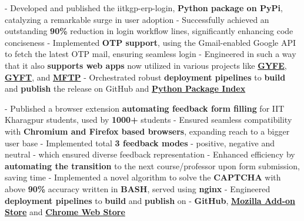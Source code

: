 \documentclass[a4paper,10pt]{extarticle} %
\begin{document}
\begin{description}[style=nextline, font=$\bullet$\hspace{2mm}\normalsize]
\item[{\href{https://github.com/proffapt/iitkgp-erp-login-pypi}{ERP Login Module}} | Python, Gmail API]
- Developed and published the iitkgp-erp-login, \textbf{Python package on PyPi}, catalyzing a remarkable surge in user adoption \newline
- Successfully achieved an outstanding \textbf{90\%} reduction in login workflow lines, significantly enhancing code conciseness \newline
- Implemented \textbf{OTP support}, using the Gmail-enabled Google API to fetch the latest OTP mail, ensuring seamless login \newline
- Engineered in such a way that it also \textbf{supports web apps} now utilized in various projects like \href{https://gyfe.metakgp.org}{\textbf{GYFE}}, \href{https://gyft.metakgp.org}{\textbf{GYFT}}, and \href{https://github.com/metakgp/mftp}{\textbf{MFTP}} \newline
- Orchestrated robust \textbf{deployment pipelines} to \textbf{build} and \textbf{publish} the release on GitHub and \href{https://pypi.org/project/iitkgp-erp-login/}{\textbf{Python Package Index}}

\item[{\href{https://github.com/proffapt/fERP}{fERP}} | HTML, CSS, JavaScript, Web Browser Extension, BASH, Nginx, OCR]
- Published a browser extension \textbf{automating feedback form filling} for IIT Kharagpur students, used by \textbf{1000+} students \newline
- Ensured seamless compatibility with \textbf{Chromium and Firefox based browsers}, expanding reach to a bigger user base \newline
- Implemented total \textbf{3 feedback modes} - positive, negative and neutral - which ensured diverse feedback representation \newline
- Enhanced efficiency by \textbf{automating the transition} to the next course/professor upon form submission, saving  time \newline
- Implemented a novel algorithm to solve the \textbf{CAPTCHA} with above \textbf{90\%} accuracy written in \textbf{BASH}, served using \textbf{nginx} \newline
- Engineered \textbf{deployment pipelines} to \textbf{build} and \textbf{publish} on - \textbf{GitHub}, \href{https://addons.mozilla.org/en-US/firefox/addon/ferp/}{\textbf{Mozilla Add-on Store}} and \href{https://chromewebstore.google.com/detail/ferp/cdmjkgfdjjebpjejjnckkgljdmijjnom?hl=en&authuser=0}{\textbf{Chrome Web Store}}


\end{description}
\end{document}
